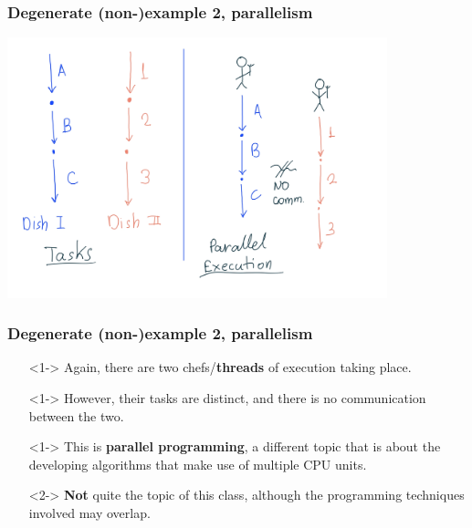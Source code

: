 \documentclass[xcolor={dvipsnames,svgnames},aspectratio=169]{beamer}
\begin{document}
\begin{frame}[fragile]
  \frametitle{Degenerate (non-)example 2, parallelism}

  \begin{center}
    \includegraphics[width=11cm,keepaspectratio]{../media/lecture1-para.png}
  \end{center}

\end{frame}

\begin{frame}[fragile]
  \frametitle{Degenerate (non-)example 2, parallelism}

  \large{
    \begin{itemize}
    \item[\faBook]<1-> Again, there are two chefs/\textbf{threads} of
      execution taking place.
    \item[\faBook]<1-> However, their tasks are distinct, and there is no
      communication between the two.
    \item[\faBook]<1-> This is \textbf{parallel programming}, a different topic
      that is about the developing algorithms that make use of
      multiple CPU units.
    \item[\faBook]<2-> \textbf{Not} quite the topic of this class,
      although the programming techniques involved may overlap.
    \end{itemize}}

\end{frame}
\end{document}
